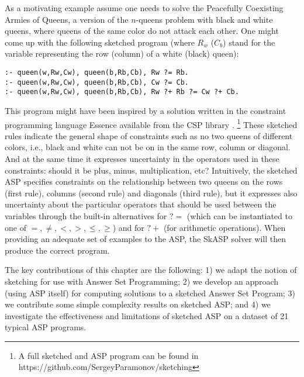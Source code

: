 As a motivating example assume 
one needs to solve %
the Peacefully Coexisting Armies of Queens, a version of the $n$-queens problem with black and white queens, where queens of the same color do not attack each other. 
One might come up with the following sketched program (where 
$R_w$ ($C_b$) stand for the variable representing the row (column) of a white (black) queen): 
\begin{lstlisting}[caption=Peacefully Coexisting Armies of Queens,label=lst:queens,basicstyle=\small\ttfamily]
:- queen(w,Rw,Cw), queen(b,Rb,Cb), Rw ?= Rb.
:- queen(w,Rw,Cw), queen(b,Rb,Cb), Cw ?= Cb.
:- queen(w,Rw,Cw), queen(b,Rb,Cb), Rw ?+ Rb ?= Cw ?+ Cb.
\end{lstlisting}
\pubrev
This program might have been inspired by a solution written in the constraint programming language Essence available from the CSP library \parencite{csplib:prob110}. \footnote{A full sketched and ASP program can be found in https://github.com/SergeyParamonov/sketching} These sketched rules indicate the general shape of constraints such as no two queens of different colors, i.e., black and white can not be on in the same row, column or diagonal. And at the same time it expresses uncertainty in the operators used in these constraints: should it be plus, minus, multiplication, etc?
\pubrevend
Intuitively, the sketched ASP specifies constraints on the relationship between two queens on the rows (first rule), columns (second rule) and diagonals (third rule), %
but it expresses also uncertainty about the particular operators that should be used between the variables 
through the built-in alternatives for ${?}{=}$  (which can be instantiated to one of $=,\neq,<,>,\leq,\geq$) and for ${?}+$ (for arithmetic operations). 
When providing an adequate set of examples to the ASP, the SkASP solver will then produce the correct program.



The key contributions of this chapter are the following: 1) we adapt the notion of sketching for use with Answer Set Programming;
2) we develop an approach (using ASP itself) for computing solutions to a sketched Answer Set Program;
3) we contribute some simple complexity results on sketched ASP; 
and 4) we investigate the effectiveness and limitations of sketched ASP on a dataset of 21 typical ASP programs. 




